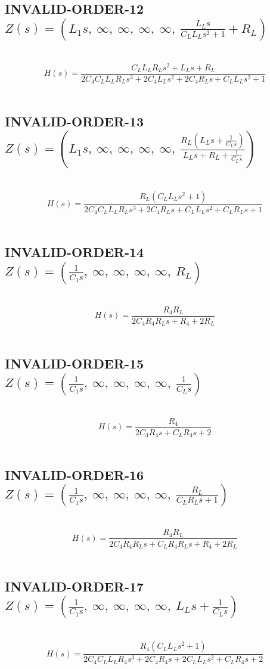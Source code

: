 \documentclass{article}
\begin{document}
\subsection{INVALID-ORDER-12 $Z(s) = \left( L_{1} s, \  \infty, \  \infty, \  \infty, \  \infty, \  \frac{L_{L} s}{C_{L} L_{L} s^{2} + 1} + R_{L}\right)$ } \ 
\textbf{\[H(s) = \frac{C_{L} L_{L} R_{L} s^{2} + L_{L} s + R_{L}}{2 C_{4} C_{L} L_{L} R_{L} s^{3} + 2 C_{4} L_{L} s^{2} + 2 C_{4} R_{L} s + C_{L} L_{L} s^{2} + 1}\] } \ 
\subsection{INVALID-ORDER-13 $Z(s) = \left( L_{1} s, \  \infty, \  \infty, \  \infty, \  \infty, \  \frac{R_{L} \left(L_{L} s + \frac{1}{C_{L} s}\right)}{L_{L} s + R_{L} + \frac{1}{C_{L} s}}\right)$ } \ 
\textbf{\[H(s) = \frac{R_{L} \left(C_{L} L_{L} s^{2} + 1\right)}{2 C_{4} C_{L} L_{L} R_{L} s^{3} + 2 C_{4} R_{L} s + C_{L} L_{L} s^{2} + C_{L} R_{L} s + 1}\] } \ 
\subsection{INVALID-ORDER-14 $Z(s) = \left( \frac{1}{C_{1} s}, \  \infty, \  \infty, \  \infty, \  \infty, \  R_{L}\right)$ } \ 
\textbf{\[H(s) = \frac{R_{4} R_{L}}{2 C_{4} R_{4} R_{L} s + R_{4} + 2 R_{L}}\] } \ 
\subsection{INVALID-ORDER-15 $Z(s) = \left( \frac{1}{C_{1} s}, \  \infty, \  \infty, \  \infty, \  \infty, \  \frac{1}{C_{L} s}\right)$ } \ 
\textbf{\[H(s) = \frac{R_{4}}{2 C_{4} R_{4} s + C_{L} R_{4} s + 2}\] } \ 
\subsection{INVALID-ORDER-16 $Z(s) = \left( \frac{1}{C_{1} s}, \  \infty, \  \infty, \  \infty, \  \infty, \  \frac{R_{L}}{C_{L} R_{L} s + 1}\right)$ } \ 
\textbf{\[H(s) = \frac{R_{4} R_{L}}{2 C_{4} R_{4} R_{L} s + C_{L} R_{4} R_{L} s + R_{4} + 2 R_{L}}\] } \ 
\subsection{INVALID-ORDER-17 $Z(s) = \left( \frac{1}{C_{1} s}, \  \infty, \  \infty, \  \infty, \  \infty, \  L_{L} s + \frac{1}{C_{L} s}\right)$ } \ 
\textbf{\[H(s) = \frac{R_{4} \left(C_{L} L_{L} s^{2} + 1\right)}{2 C_{4} C_{L} L_{L} R_{4} s^{3} + 2 C_{4} R_{4} s + 2 C_{L} L_{L} s^{2} + C_{L} R_{4} s + 2}\] } \ 
\end{document}
